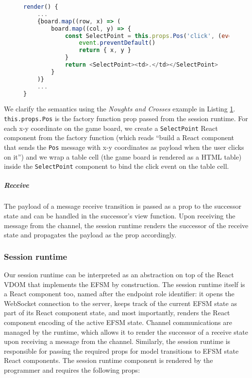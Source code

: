 \documentclass[submission,copyright,creativecommons]{eptcs}
\begin{document}
\begin{figure}[!h]
\begin{lstlisting}[language=JavaScript, tabsize=4]
render() {
	...
	{board.map((row, x) => (
		board.map((col, y) => {
			const SelectPoint = this.props.Pos('click', (event: UIEvent) => {
				event.preventDefault()
				return { x, y }
			}
			return <SelectPoint><td>.</td></SelectPoint>
		}
	)}
	...	
}
\end{lstlisting}  
\label{lst:clientapp}
\end{figure}

We clarify the semantics using the \textit{Noughts and Crosses} example in Listing \ref{lst:clientapp}. \texttt{this.props.Pos} is the factory function prop passed from the session runtime. For each x-y coordinate on the game board, we create a \texttt{SelectPoint} React component from the factory function (which reads ``build a React component that sends the \texttt{Pos} message with x-y coordinates as payload when the user clicks on it'') and we wrap a table cell (the game board is rendered as a HTML table) inside the \texttt{SelectPoint} component to bind the click event on the table cell.

\subparagraph{Receive} The payload of a message receive transition is passed as a prop to the successor state and can be handled in the successor's view function. Upon receiving the message from the channel, the session runtime renders the successor of the receive state and propagates the payload as the prop accordingly.

\subsubsection{Session runtime}
\label{section:clientruntime}

Our session runtime can be interpreted as an abstraction on top of the React VDOM that implements the EFSM by construction. The session runtime itself is a React component too, named after the endpoint role identifier: it opens the WebSocket connection to the server, keeps track of the current EFSM state as part of its React component state, and most importantly, renders the React component encoding of the active EFSM state. Channel communications are managed by the runtime, which allows it to render the successor of a receive state upon receiving a message from the channel. Similarly, the session runtime is responsible for passing the required props for model transitions to EFSM state React components. The session runtime component is rendered by the programmer and requires the following props:
\end{document}
